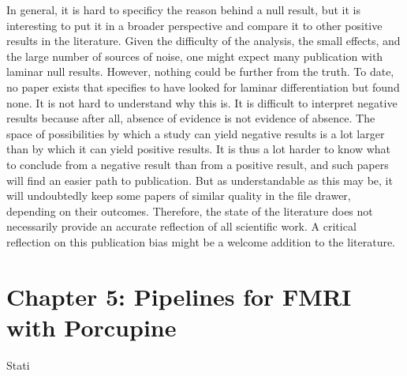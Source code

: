 In general, it is hard to specificy the reason behind a null result, but it is interesting to put it in a broader perspective and compare it to other positive results in the literature. Given the difficulty of the analysis, the small effects, and the large number of sources of noise, one might expect many publication with laminar null results. However, nothing could be further from the truth. To date, no paper exists that specifies to have looked for laminar differentiation but found none. %
It is not hard to understand why this is. It is difficult to interpret negative results because after all, absence of evidence is not evidence of absence. The space of possibilities by which a study can yield negative results is a lot larger than by which it can yield positive results. It is thus a lot harder to know what to conclude from a negative result than from a positive result, and such papers will find an easier path to publication. But as understandable as this may be, it will undoubtedly keep some papers of similar quality in the file drawer, depending on their outcomes. Therefore, the state of the literature does not necessarily provide an accurate reflection of all scientific work. A critical reflection on this publication bias might be a welcome addition to the literature. 

\section*{Chapter 5: Pipelines for FMRI with Porcupine}


Stati




\linespread{1.5}
\newpage